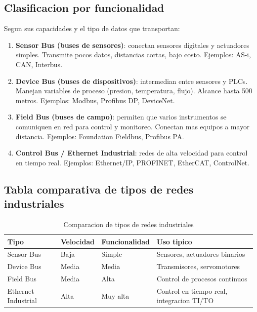 \subsection{Clasificacion por funcionalidad}

Segun sus capacidades y el tipo de datos que transportan:

\begin{enumerate}
    \item \textbf{Sensor Bus (buses de sensores)}: conectan sensores digitales y
    actuadores simples. Transmite pocos datos, distancias cortas, bajo costo.
    Ejemplos: AS-i, CAN, Interbus.
    \item \textbf{Device Bus (buses de dispositivos)}: intermedian entre sensores y
    PLCs. Manejan variables de proceso (presion, temperatura, flujo).
    Alcance hasta 500 metros. Ejemplos: Modbus, Profibus DP, DeviceNet.
    \item \textbf{Field Bus (buses de campo)}: permiten que varios instrumentos se
    comuniquen en red para control y monitoreo. Conectan mas equipos a mayor
    distancia. Ejemplos: Foundation Fieldbus, Profibus PA.
    \item \textbf{Control Bus / Ethernet Industrial}: redes de alta velocidad para
    control en tiempo real. Ejemplos: Ethernet/IP, PROFINET, EtherCAT, ControlNet.
\end{enumerate}

\subsection{Tabla comparativa de tipos de redes industriales}

\begin{table}[htbp]
\centering
\small
\caption{Comparacion de tipos de redes industriales}
\begin{tabularx}{\textwidth}{@{}l>{\raggedright\arraybackslash}X>{\raggedright\arraybackslash}X>{\raggedright\arraybackslash}X@{}}
\toprule
\textbf{Tipo} & \textbf{Velocidad} & \textbf{Funcionalidad} & \textbf{Uso tipico} \\
\midrule
Sensor Bus & Baja & Simple & Sensores, actuadores binarios \\
Device Bus & Media & Media & Transmisores, servomotores \\
Field Bus & Media & Alta & Control de procesos continuos \\
Ethernet Industrial & Alta & Muy alta & Control en tiempo real, integracion TI/TO \\
\bottomrule
\end{tabularx}
\end{table}


